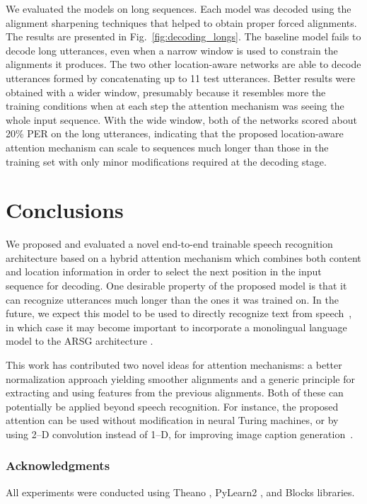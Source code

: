 \documentclass{article}
\begin{document}
We evaluated the models on long sequences. Each model was decoded using the
alignment sharpening techniques that helped to obtain proper forced alignments.
The results are presented in Fig.~\ref{fig:decoding_longs}. The baseline model
fails to decode long utterances, even when a narrow window is used to constrain
the alignments it produces. The two other location-aware networks 
are able to decode utterances formed by concatenating up to 11 test utterances.
Better results were obtained with a wider window, presumably because it
resembles more the training conditions when at each step the attention mechanism
was seeing the whole input sequence.  With the wide window, both of the networks
scored about 20\% PER on the long utterances, indicating that the proposed
location-aware attention mechanism can scale to sequences much longer than those
in the training set with only minor modifications required at the decoding
stage.

\section{Conclusions}

We proposed and evaluated a novel end-to-end trainable speech recognition
architecture based on a hybrid attention mechanism which combines both content
and location information in order to select the next position in the input
sequence for decoding. One desirable property of the proposed model is that it
can recognize utterances much longer than the ones it was trained on. In the
future, we expect this model to be used to directly recognize text from
speech~\cite{hannun2014_deepspeech,graves_2014_towards}, in which case  it may
become important to incorporate a monolingual language model to the ARSG
architecture \cite{gulcehre_2015}.

This work has contributed two novel ideas for attention mechanisms: a better
normalization approach yielding smoother alignments and a generic principle for
extracting and using features from the previous alignments. 
Both of these can potentially be applied beyond speech recognition. For
instance, the proposed attention can be used without
modification in neural Turing machines, or by using 2--D
convolution instead of 1--D, for improving image caption
generation~\cite{xu_show_2015}.


\subsubsection*{Acknowledgments}
All experiments were conducted using Theano
\cite{bergstra+al:2010-scipy,Bastien-Theano-2012}, PyLearn2
\cite{pylearn2_arxiv_2013}, and Blocks
\cite{vanmerrienboer_blocks_2015} libraries.
\end{document}
